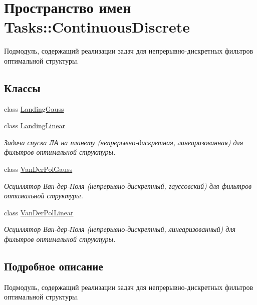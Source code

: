 \hypertarget{namespace_tasks_1_1_continuous_discrete}{}\section{Пространство имен Tasks\+:\+:Continuous\+Discrete}
\label{namespace_tasks_1_1_continuous_discrete}


Подмодуль, содержащий реализации задач для непрерывно-\/дискретных фильтров оптимальной структуры.  


\subsection*{Классы}
\begin{DoxyCompactItemize}
\item 
class \hyperlink{class_tasks_1_1_continuous_discrete_1_1_landing_gauss}{Landing\+Gauss}
\item 
class \hyperlink{class_tasks_1_1_continuous_discrete_1_1_landing_linear}{Landing\+Linear}
\begin{DoxyCompactList}\small\item\em Задача спуска ЛА на планету (непрерывно-\/дискретная, линеаризованная) для фильтров оптимальной структуры. \end{DoxyCompactList}\item 
class \hyperlink{class_tasks_1_1_continuous_discrete_1_1_van_der_pol_gauss}{Van\+Der\+Pol\+Gauss}
\begin{DoxyCompactList}\small\item\em Осциллятор Ван-\/дер-\/Поля (непрерывно-\/дискретный, гауссовский) для фильтров оптимальной структуры. \end{DoxyCompactList}\item 
class \hyperlink{class_tasks_1_1_continuous_discrete_1_1_van_der_pol_linear}{Van\+Der\+Pol\+Linear}
\begin{DoxyCompactList}\small\item\em Осциллятор Ван-\/дер-\/Поля (непрерывно-\/дискретный, линеаризованный) для фильтров оптимальной структуры. \end{DoxyCompactList}\end{DoxyCompactItemize}


\subsection{Подробное описание}
Подмодуль, содержащий реализации задач для непрерывно-\/дискретных фильтров оптимальной структуры. 